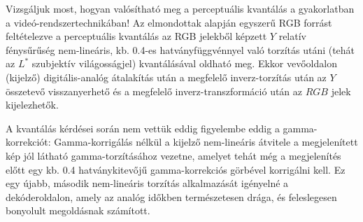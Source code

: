 Vizsgáljuk most, hogyan valósítható meg a perceptuális kvantálás a gyakorlatban a videó-rendszertechnikában!
Az elmondottak alapján egyszerű RGB forrást feltételezve a perceptuális kvantálás az RGB jelekből képzett $Y$ relatív fénysűrűség nem-lineáris, kb. 0.4-es hatványfüggvénnyel való torzítás utáni (tehát az $L^*$ szubjektív világosságjel) kvantálásával oldható meg.
Ekkor vevőoldalon (kijelző) digitális-analóg átalakítás után a megfelelő inverz-torzítás után az $Y$ összetevő visszanyerhető és a megfelelő inverz-transzformáció után az $RGB$ jelek kijelezhetők.

A kvantálás kérdései során nem vettük eddig figyelembe eddig a gamma-korrekciót: 
Gamma-korrigálás nélkül a kijelző nem-lineáris átvitele a megjelenített kép jól látható gamma-torzításához vezetne, amelyet tehát még a megjelenítés előtt egy kb. 0.4 hatványkitevőjű gamma-korrekciós görbével korrigálni kell.
Ez egy újabb, második nem-lineáris torzítás alkalmazását igényelné a dekóderoldalon, amely az analóg időkben természetesen drága, és feleslegesen bonyolult megoldásnak számított.


